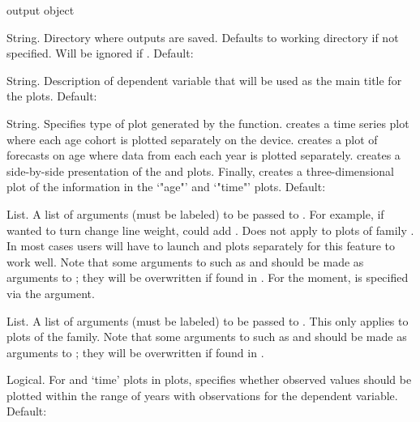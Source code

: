 \begin{Arguments}
\begin{ldescription}

\item[\code{x}]  output object

\item[\code{dpath}] String. Directory where  outputs are
saved. Defaults to working directory if not specified. Will be
ignored if . Default: 

\item[\code{dvlabel}] String. Description of dependent variable that will be
used as the main title for the plots. Default: 

\item[\code{family}] String. Specifies type of plot generated by the
function.   creates a time series plot where each age
cohort is plotted separately on the device.  creates a
plot of forecasts on age where data from each each year is
plotted separately.   creates a side-by-side
presentation of the  and  plots. Finally,
 creates a three-dimensional plot of the
information in the `"age"' and `"time"'
plots. Default: 

\item[\code{args.matplot}] List. A list of arguments (must be labeled) to be
passed to . For example, if wanted to turn change line
weight, could add . Does not apply to
plots of family . In most cases users will
have to launch  and  plots separately for this
feature to work well. Note that some arguments to 
such as  and  should be made as arguments to
; they will be overwritten if found in
. For the moment,  is specified via the
 argument.

\item[\code{args.wireframe}] List. A list of arguments (must be labeled) to be
passed to . This only applies to plots of the
 family. Note that some arguments to 
such as  and  should be made as arguments to
; they will be overwritten if found in
.

\item[\code{time.insamp.obs}] Logical. For  and `time' plots in
 plots, specifies whether observed values should be
plotted within the range of years with observations for the
dependent variable. Default: 


\end{ldescription}
\end{Arguments}
